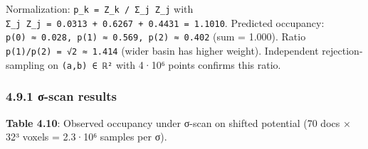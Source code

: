 \documentclass[
]{article}
\begin{document}
Normalization: \texttt{p\_k\ =\ Z\_k\ /\ Σ\_j\ Z\_j} with
\texttt{Σ\_j\ Z\_j\ =\ 0.0313\ +\ 0.6267\ +\ 0.4431\ =\ 1.1010}.
Predicted occupancy:
\texttt{p(0)\ ≈\ 0.028,\ p(1)\ ≈\ 0.569,\ p(2)\ ≈\ 0.402} (sum = 1.000).
Ratio \texttt{p(1)/p(2)\ =\ √2\ ≈\ 1.414} (wider basin has higher
weight). Independent rejection-sampling on \texttt{(a,b)\ ∈\ ℝ²} with
4·10⁶ points confirms this ratio.

\hypertarget{ux3c3-scan-results}{%
\subsubsection{4.9.1 σ-scan results}\label{ux3c3-scan-results}}

\textbf{Table 4.10}: Observed occupancy under σ-scan on shifted
potential (70 docs × 32³ voxels = 2.3·10⁶ samples per σ).
\end{document}
